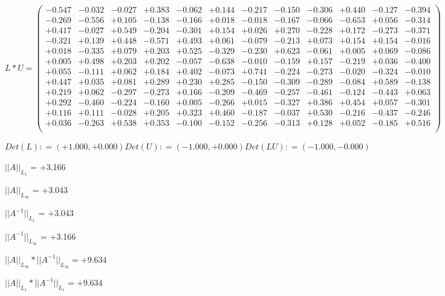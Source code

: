 \documentclass[9pt]{article}
\theoremstyle{plain}
\theoremstyle{definition}
\theoremstyle{remark}
\numberwithin{equation}{section}
\begin{document}
$L * U  = \left(
\begin{array}{
cccccccccccc}
-0.547 & -0.032 & -0.027 & +0.383 & -0.062 & +0.144 & -0.217 & -0.150 & -0.306 & +0.440 & -0.127 & -0.394 \\
-0.269 & -0.556 & +0.105 & -0.138 & -0.166 & +0.018 & -0.018 & -0.167 & -0.066 & -0.653 & +0.056 & -0.314 \\
+0.417 & -0.027 & +0.549 & -0.204 & -0.301 & +0.154 & +0.026 & +0.270 & -0.228 & +0.172 & -0.273 & -0.371 \\
-0.321 & +0.139 & +0.448 & -0.571 & +0.493 & +0.061 & -0.079 & -0.213 & +0.073 & +0.154 & +0.154 & -0.016 \\
+0.018 & -0.335 & +0.079 & +0.203 & +0.525 & -0.329 & -0.230 & +0.623 & -0.061 & +0.005 & +0.069 & -0.086 \\
+0.005 & +0.498 & +0.203 & +0.202 & -0.057 & -0.638 & -0.010 & -0.159 & +0.157 & -0.219 & +0.036 & -0.400 \\
+0.055 & -0.111 & +0.062 & +0.184 & +0.402 & -0.073 & +0.741 & -0.224 & -0.273 & -0.020 & -0.324 & -0.010 \\
+0.447 & +0.035 & +0.081 & +0.289 & +0.230 & +0.285 & -0.150 & -0.309 & -0.289 & -0.084 & +0.589 & -0.138 \\
+0.219 & +0.062 & -0.297 & -0.273 & +0.166 & -0.209 & -0.469 & -0.257 & -0.461 & -0.124 & -0.443 & +0.063 \\
+0.292 & -0.460 & -0.224 & -0.160 & +0.005 & -0.266 & +0.015 & -0.327 & +0.386 & +0.454 & +0.057 & -0.301 \\
+0.116 & +0.111 & -0.028 & +0.205 & +0.323 & +0.460 & -0.187 & -0.037 & +0.530 & -0.216 & -0.437 & -0.246 \\
+0.036 & -0.263 & +0.538 & +0.353 & -0.100 & -0.152 & -0.256 & -0.313 & +0.128 & +0.052 & -0.185 & +0.516 \\
\end{array}
\right)$ \newline 

$Det(L) :    = (+1.000,+0.000)     Det(U) :    = (-1.000,+0.000)     Det(LU) :    = (-1.000,-0.000)$

$||A||_{L_1}$  = +3.166

$||A||_{L_{\infty}}$ = +3.043

$||A^{-1}||_{L_1}$  = +3.043

$||A^{-1}||_{L_{\infty}}$ = +3.166

$||A||_{L_{\infty}} * ||A^{-1}||_{L_{\infty}} = +9.634$

$||A||_{L_1} * ||A^{-1}||_{L_1} = +9.634$
\end{document}
